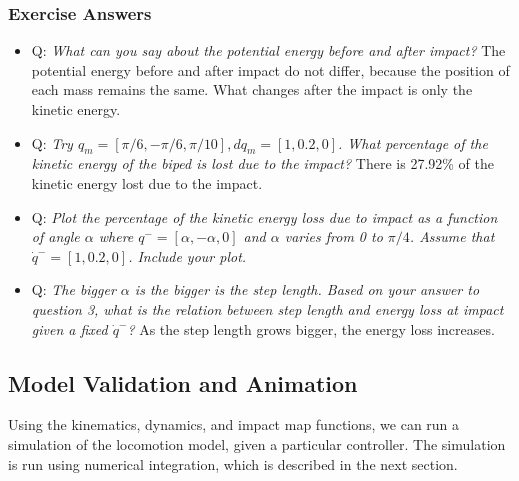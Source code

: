 \subsubsection{Exercise Answers}
\begin{itemize}
\item Q: \emph{What can you say about the potential energy before and after impact?} 
The potential energy before and after impact do not differ, because the position of each mass remains the same. What changes after the impact is only the kinetic energy.
\item Q: \emph{Try $q_m = [\pi/6, -\pi/6, \pi/10], dq_m = [1, 0.2, 0]$. What percentage of the kinetic energy of the biped is lost due to the impact?}  
There is 27.92\% of the kinetic energy lost due to the impact. 
\item Q: \emph{Plot the percentage of the kinetic energy loss due to impact as a function of angle $\alpha$ where $q^- = [\alpha, -\alpha, 0]$  and $\alpha$ varies from 0 to $\pi/4$. Assume that $\dot q^- = [1, 0.2, 0]$. Include your plot.}

\raggedright \item Q: \emph{The bigger $\alpha$ is the bigger is the step length. Based on your answer to question 3, what is the relation between step length and energy loss at impact given a fixed $\dot q^-$?}
As the step length grows bigger, the energy loss increases.    
\end{itemize}

\subsection{Model Validation and Animation}
\label{sec:validation}
Using the kinematics, dynamics, and impact map functions, we can run a simulation of the locomotion model, given a particular controller. The simulation is run using numerical integration, which is described in the next section. 
%
